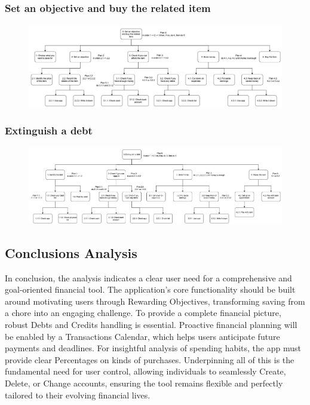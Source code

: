 \documentclass[a4paper,12pt]{article}
\begin{document}
\subsubsection{Set an objective and buy the related item}
\begin{figure}[H]
    \centering
    \includegraphics[width=\linewidth]{HTA2.png}
\end{figure}

\subsubsection{Extinguish a debt}
\begin{figure}[H]
    \centering
    \includegraphics[width=\linewidth]{HTA3.png}
\end{figure}
\vspace{5cm} 

\subsection{Conclusions Analysis}

In conclusion, the analysis indicates a clear user need for a comprehensive and goal-oriented financial tool. The application's core functionality should be built around motivating users through Rewarding Objectives, transforming saving from a chore into an engaging challenge. To provide a complete financial picture, robust Debts and Credits handling is essential. Proactive financial planning will be enabled by a Transactions Calendar, which helps users anticipate future payments and deadlines. For insightful analysis of spending habits, the app must provide clear Percentages on kinds of purchases. Underpinning all of this is the fundamental need for user control, allowing individuals to seamlessly Create, Delete, or Change accounts, ensuring the tool remains flexible and perfectly tailored to their evolving financial lives.
\end{document}
